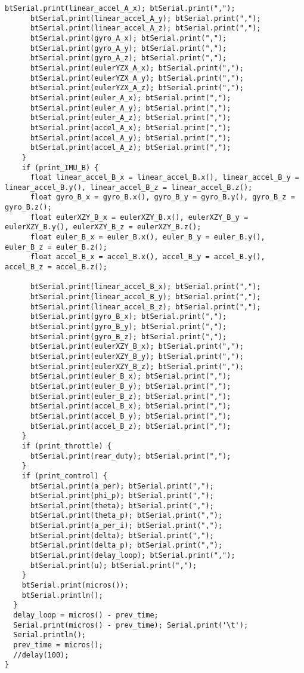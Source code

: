 \begin{lstlisting}[style=codearduino]
      btSerial.print(linear_accel_A_x); btSerial.print(",");
      btSerial.print(linear_accel_A_y); btSerial.print(",");
      btSerial.print(linear_accel_A_z); btSerial.print(",");
      btSerial.print(gyro_A_x); btSerial.print(",");
      btSerial.print(gyro_A_y); btSerial.print(",");
      btSerial.print(gyro_A_z); btSerial.print(",");
      btSerial.print(eulerYZX_A_x); btSerial.print(",");
      btSerial.print(eulerYZX_A_y); btSerial.print(",");
      btSerial.print(eulerYZX_A_z); btSerial.print(",");
      btSerial.print(euler_A_x); btSerial.print(",");
      btSerial.print(euler_A_y); btSerial.print(",");
      btSerial.print(euler_A_z); btSerial.print(",");
      btSerial.print(accel_A_x); btSerial.print(",");
      btSerial.print(accel_A_y); btSerial.print(",");
      btSerial.print(accel_A_z); btSerial.print(",");
    }
    if (print_IMU_B) {
      float linear_accel_B_x = linear_accel_B.x(), linear_accel_B_y = linear_accel_B.y(), linear_accel_B_z = linear_accel_B.z();
      float gyro_B_x = gyro_B.x(), gyro_B_y = gyro_B.y(), gyro_B_z = gyro_B.z();
      float eulerXZY_B_x = eulerXZY_B.x(), eulerXZY_B_y = eulerXZY_B.y(), eulerXZY_B_z = eulerXZY_B.z();
      float euler_B_x = euler_B.x(), euler_B_y = euler_B.y(), euler_B_z = euler_B.z();
      float accel_B_x = accel_B.x(), accel_B_y = accel_B.y(), accel_B_z = accel_B.z();

      btSerial.print(linear_accel_B_x); btSerial.print(",");
      btSerial.print(linear_accel_B_y); btSerial.print(",");
      btSerial.print(linear_accel_B_z); btSerial.print(",");
      btSerial.print(gyro_B_x); btSerial.print(",");
      btSerial.print(gyro_B_y); btSerial.print(",");
      btSerial.print(gyro_B_z); btSerial.print(",");
      btSerial.print(eulerXZY_B_x); btSerial.print(",");
      btSerial.print(eulerXZY_B_y); btSerial.print(",");
      btSerial.print(eulerXZY_B_z); btSerial.print(",");
      btSerial.print(euler_B_x); btSerial.print(",");
      btSerial.print(euler_B_y); btSerial.print(",");
      btSerial.print(euler_B_z); btSerial.print(",");
      btSerial.print(accel_B_x); btSerial.print(",");
      btSerial.print(accel_B_y); btSerial.print(",");
      btSerial.print(accel_B_z); btSerial.print(",");
    }
    if (print_throttle) {
      btSerial.print(rear_duty); btSerial.print(",");
    }
    if (print_control) {
      btSerial.print(a_per); btSerial.print(",");
      btSerial.print(phi_p); btSerial.print(",");
      btSerial.print(theta); btSerial.print(",");
      btSerial.print(theta_p); btSerial.print(",");
      btSerial.print(a_per_i); btSerial.print(",");
      btSerial.print(delta); btSerial.print(",");
      btSerial.print(delta_p); btSerial.print(",");
      btSerial.print(delay_loop); btSerial.print(",");
      btSerial.print(u); btSerial.print(",");
    }
    btSerial.print(micros());
    btSerial.println();
  }
  delay_loop = micros() - prev_time;
  Serial.print(micros() - prev_time); Serial.print('\t');
  Serial.println();
  prev_time = micros();
  //delay(100);
}


\end{lstlisting}
